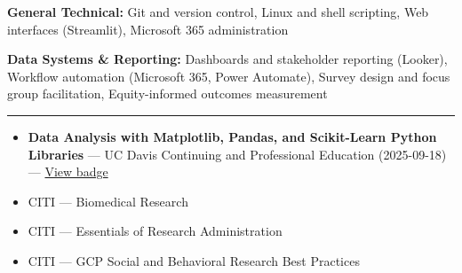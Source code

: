 \documentclass[11pt]{article}
\providecommand{\tightlist}{\setlength{\itemsep}{0pt}\setlength{\parskip}{0pt}}
\renewcommand{\subsection}[1]{\par\medskip\noindent{\sffamily\bfseries\fontsize{11pt}{0}\selectfont #1}\par\smallskip}
\begin{document}
\textbf{General Technical:} Git and version control, Linux and shell
scripting, Web interfaces (Streamlit), Microsoft 365 administration

\textbf{Data Systems \& Reporting:} Dashboards and stakeholder reporting
(Looker), Workflow automation (Microsoft 365, Power Automate), Survey
design and focus group facilitation, Equity-informed outcomes
measurement

\begin{center}\rule{0.5\linewidth}{0.5pt}\end{center}

\subsection{Certifications}\label{certifications-1}

\begin{itemize}
\tightlist
\item
  \textbf{Data Analysis with Matplotlib, Pandas, and Scikit-Learn Python
  Libraries} --- UC Davis Continuing and Professional Education
  (2025-09-18) ---
  \href{https://www.credly.com/badges/505ef11c-58b4-48bd-aa9e-5a21f0247d46/public_url}{View
  badge}
\item
  CITI --- Biomedical Research
\item
  CITI --- Essentials of Research Administration
\item
  CITI --- GCP Social and Behavioral Research Best Practices
\end{itemize}
\end{document}
